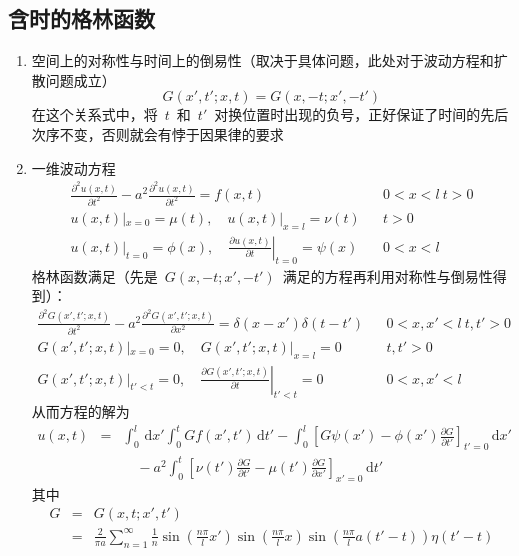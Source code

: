 \documentclass[12pt,a4paper]{article}
\newcommand\diff{\,\mathrm{d}}
\renewcommand*{\vec}[1]{\bm{#1}}%
\renewcommand{\[}{\ $\displaystyle}
\renewcommand{\]}{$\ }%
\newcommand{\pard}[2]{\ensuremath{\frac{\partial #1}{\partial #2}}}
\newcommand{\pardsq}[2]{\ensuremath{\frac{\partial^2 #1}{\partial #2^2}}}
\newcommand{\summ}[2][n]{\sum_{#1=#2}^\infty}
\begin{document}
	\subsection{含时的格林函数}
	  \begin{enumerate}
	   \item 空间上的对称性与时间上的倒易性（取决于具体问题，此处对于波动方程和扩散问题成立）
	    $$
	      G(x',t';x,t) = G(x,-t;x',-t')
	    $$
	    在这个关系式中，将\[t\]和\[t'\]对换位置时出现的负号，正好保证了时间的先后次序不变，否则就会有悖于因果律的要求
	    \item 一维波动方程
	    	\begin{eqnarray*}
	    	 \pardsq{u(x,t)}{t} - a^2\pardsq{u(x,t)}{t} = f(x,t) &&0<x<l~t>0 \\
	    	 u(x,t)|_{x=0} = \mu(t),\quad u(x,t)|_{x=l} = \nu(t) &&t>0\\
	    	 u(x,t)|_{t=0} = \phi(x),\quad \left.\pard{u(x,t)}{t}\right|_{t=0} = \psi(x) &&0<x<l
	    	\end{eqnarray*}
	    	格林函数满足（先是\[G(x,-t;x',-t')\]满足的方程再利用对称性与倒易性得到）：
	    	\begin{eqnarray*}
	    	 \pardsq{G(x',t';x,t)}{t} - a^2\pardsq{G(x',t';x,t)}{x} = \delta(x-x')\delta(t-t') &&0<x,x'<l~t,t'>0 \\
	    	 G(x',t';x,t)|_{x=0} = 0,\quad G(x',t';x,t)|_{x=l} = 0 &&t,t'>0\\
	    	 G(x',t';x,t)|_{t'<t} = 0,\quad \left.\pard{G(x',t';x,t)}{t}\right|_{t'<t} = 0 &&0<x,x'<l
	    	\end{eqnarray*}
	    	从而方程的解为
	    	\begin{eqnarray*}
	    	 u(x,t) &=& \int_0^l\diff x'\int_0^t Gf(x',t')\diff t' - \int_0^l\left[G\psi(x') - \phi(x')\pard{G}{t'}\right]_{t'=0}\diff x' \\
	    	 && \quad - a^2\int_0^t\left[\nu(t')\pard{G}{t'} - \mu(t')\pard{G}{x'}\right]_{x'=0}\diff t'
	    	\end{eqnarray*}
	    	其中
	    	\begin{eqnarray*}
	    	 G &=& G(x,t;x',t') \\
	    	  &=&\frac{2}{\pi a}\summ{1}\frac{1}{n}\sin\left(\frac{n\pi}{l}x'\right)\sin\left(\frac{n\pi}{l}x\right)\sin\left(\frac{n\pi}{l}a(t'-t)\right)\eta(t'-t)
	    	\end{eqnarray*}

\end{enumerate}
\end{document}
